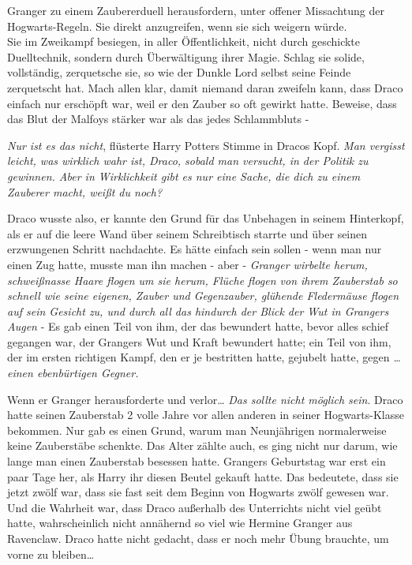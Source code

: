 {Granger zu einem Zaubererduell herausfordern, unter offener Missachtung der Hogwarts-Regeln. Sie direkt anzugreifen, wenn sie sich weigern würde.\\ Sie im Zweikampf besiegen, in aller Öffentlichkeit, nicht durch geschickte Duelltechnik, sondern durch Überwältigung ihrer Magie. Schlag sie solide, vollständig, zerquetsche sie, so wie der Dunkle Lord selbst seine Feinde zerquetscht hat. Mach allen klar, damit niemand daran zweifeln kann, dass Draco einfach nur erschöpft war, weil er den Zauber so oft gewirkt hatte. Beweise, dass das Blut der Malfoys stärker war als das jedes Schlammbluts -

\emph{Nur ist es das nicht}, flüsterte Harry Potters Stimme in Dracos Kopf. \emph{Man vergisst leicht, was wirklich wahr ist, Draco, sobald man versucht, in der Politik zu gewinnen. Aber in Wirklichkeit gibt es nur eine Sache, die dich zu einem Zauberer macht, weißt du noch?}

Draco wusste also, er kannte den Grund für das Unbehagen in seinem Hinterkopf, als er auf die leere Wand über seinem Schreibtisch starrte und über seinen erzwungenen Schritt nachdachte. Es hätte einfach sein sollen - wenn man nur einen Zug hatte, musste man ihn machen - aber - \emph{Granger wirbelte herum, schweißnasse Haare flogen um sie herum, Flüche flogen von ihrem Zauberstab so schnell wie seine eigenen, Zauber und Gegenzauber, glühende Fledermäuse flogen auf sein Gesicht zu, und durch all das hindurch der Blick der Wut in Grangers Augen} - Es gab einen Teil von ihm, der das bewundert hatte, bevor alles schief gegangen war, der Grangers Wut und Kraft bewundert hatte; ein Teil von ihm, der im ersten richtigen Kampf, den er je bestritten hatte, gejubelt hatte, gegen \emph{… einen ebenbürtigen Gegner.}

Wenn er Granger herausforderte und verlor… \emph{Das sollte nicht möglich sein}. Draco hatte seinen Zauberstab 2 volle Jahre vor allen anderen in seiner Hogwarts-Klasse bekommen. Nur gab es einen Grund, warum man Neunjährigen normalerweise keine Zauberstäbe schenkte. Das Alter zählte auch, es ging nicht nur darum, wie lange man einen Zauberstab besessen hatte. Grangers Geburtstag war erst ein paar Tage her, als Harry ihr diesen Beutel gekauft hatte. Das bedeutete, dass sie jetzt zwölf war, dass sie fast seit dem Beginn von Hogwarts zwölf gewesen war. Und die Wahrheit war, dass Draco außerhalb des Unterrichts nicht viel geübt hatte, wahrscheinlich nicht annähernd so viel wie Hermine Granger aus Ravenclaw. Draco hatte nicht gedacht, dass er noch mehr Übung brauchte, um vorne zu bleiben…

}
